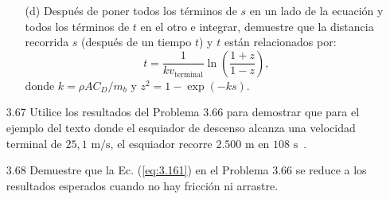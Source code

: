 \documentclass[12pt]{book}
\begin{document}
\begin{enumerate}
\begin{enumerate}
\begin{equation}
\label{eq:3.163}
\end{equation}
\item[(d)] Después de poner todos los términos de $s$ en un lado de la ecuación y todos los términos de $t$ en el otro e integrar, demuestre que la distancia recorrida $s$ (después de un tiempo $t$) y $t$ están relacionados por:
\begin{equation}
t = \frac{1}{k v_{\text{terminal}}} \ln \left( \frac{1 + z}{1 - z} \right),
\label{eq:3.164}
\end{equation}
donde $k = \rho A C_D / m_b$ y $z^2 = 1 - \exp(-k s)$.
\end{enumerate}

\item[3.67] Utilice los resultados del Problema 3.66 para demostrar que para el ejemplo del texto donde el esquiador de descenso alcanza una velocidad terminal de $25{,}1\text{ m/s}$, el esquiador recorre $2.500\text{ m}$ en $108\text{ s}$~\cite{ref135}.

\item[3.68] Demuestre que la Ec. (\ref{eq:3.161}) en el Problema 3.66 se reduce a los resultados esperados cuando no hay fricción ni arrastre.


\end{enumerate}
\end{document}
